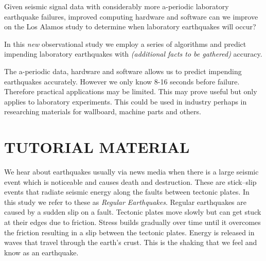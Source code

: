 \documentclass[]{llncs}
\begin{document}
Given seismic signal data with considerably more a-periodic laboratory earthquake failures, improved computing hardware and software can we improve on the Los Alamos study\cite{Bertrand} to determine when laboratory earthquakes will occur?\par

In this {\em new} observational study we employ a series of algorithms and predict impending laboratory earthquakes with {\em (additional facts to be gathered)} accuracy.

The a-periodic data, hardware and software allows us to predict impending earthquakes accurately. However we only know 8-16 seconds before failure. Therefore practical applications may be limited. This may prove useful but only applies to laboratory experiments. This could be used in industry perhaps in researching materials for wallboard, machine parts and others.\par

\section{TUTORIAL MATERIAL}
We hear about earthquakes usually via news media when there is a large seismic event which is noticeable and causes death and destruction. These are stick–slip events that radiate seismic energy along the faults between tectonic plates. In this study we refer to these as {\em Regular Earthquakes}. Regular earthquakes are caused by a sudden slip on a fault. Tectonic plates move slowly but can get stuck at their edges due to friction. Stress builds gradually over time until it overcomes the friction resulting in a slip between the tectonic plates. Energy is released in waves that travel through the earth's crust. This is the shaking that we feel and know as an earthquake\cite{USGSfaqs}.\par
\end{document}
